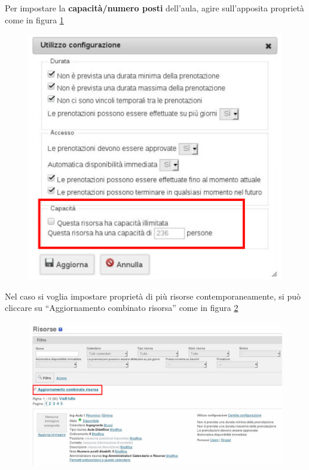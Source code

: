 Per impostare la \textbf{capacità/numero posti} dell'aula, agire sull'apposita proprietà come in figura
\ref{fig:risorsa_configurazione_proprieta_capacita.pdf}

\begin{figure}[H]
\centering{}\includegraphics[scale=0.7]{Immagini/risorsa_configurazione_proprieta_capacita.pdf}
\normalsize
\caption{}
\label{fig:risorsa_configurazione_proprieta_capacita.pdf}
\end{figure}

Nel caso si voglia impostare proprietà di più risorse contemporaneamente, si può cliccare su
``Aggiornamento combinato risorsa'' come in figura
\ref{fig:risorsa_selezione_configurazione_multipla.pdf}

\begin{figure}[H]
\centering{}\includegraphics[scale=0.5]{Immagini/risorsa_selezione_configurazione_multipla.pdf}
\normalsize
\caption{}
\label{fig:risorsa_selezione_configurazione_multipla.pdf}
\end{figure}